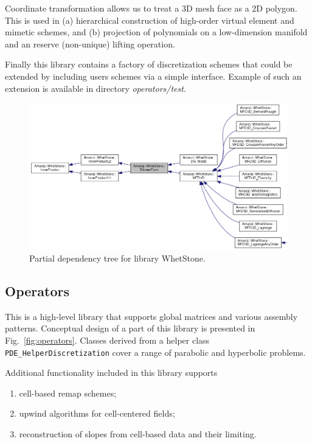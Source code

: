Coordinate transformation allows us to treat a 3D mesh face as a 2D polygon.
This is used in (a) hierarchical construction of high-order virtual element and mimetic 
schemes, and (b) projection of polynomials on a low-dimension manifold and an reserve (non-unique)
lifting operation.

Finally this library contains a factory of discretization schemes that could
be extended by including users schemes via a simple interface.
Example of such an extension is available in directory {\it operators/test}.


\begin{figure}[h!]
\includegraphics[width=1.0\textwidth]{figs/whetstone.png}
\caption{Partial dependency tree for library WhetStone.\label{fig:whetstone}}
\end{figure}


\clearpage
\subsection{Operators}
This is a high-level library that supports global matrices and
various assembly patterns.
Conceptual design of a part of this library is presented in Fig.~\ref{fig:operators}.
Classes derived from a helper class {\tt PDE\_HelperDiscretization} cover 
a range of parabolic and hyperbolic problems.

Additional functionality included in this library supports
\begin{enumerate}
\item cell-based remap schemes;
\item upwind algorithms for cell-centered fields;
\item reconstruction of slopes from cell-based data and their limiting.
\end{enumerate}

